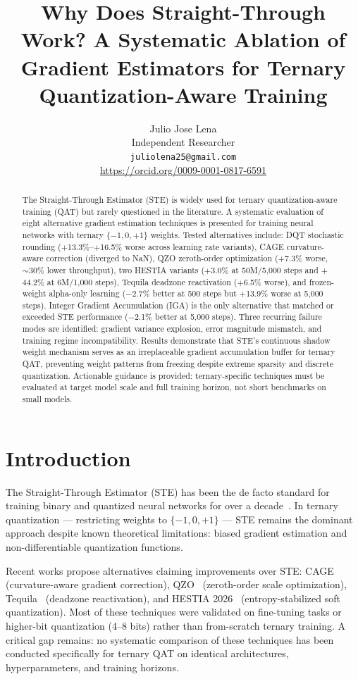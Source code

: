 \documentclass{article}
\title{Why Does Straight-Through Work? A Systematic Ablation of Gradient Estimators for Ternary Quantization-Aware Training}
\author{
  Julio Jose Lena \\
  Independent Researcher \\
  \texttt{juliolena25@gmail.com} \\
  \url{https://orcid.org/0009-0001-0817-6591}
}
\begin{document}
\maketitle

\begin{abstract}
The Straight-Through Estimator (STE) is widely used for ternary quantization-aware training (QAT) but rarely questioned in the literature. A systematic evaluation of eight alternative gradient estimation techniques is presented for training neural networks with ternary $\{-1, 0, +1\}$ weights. Tested alternatives include: DQT stochastic rounding ($+$13.3\%--$+$16.5\% worse across learning rate variants), CAGE curvature-aware correction (diverged to NaN), QZO zeroth-order optimization ($+$7.3\% worse, ${\sim}30\%$ lower throughput), two HESTIA variants ($+$3.0\% at 50M/5{,}000 steps and $+$44.2\% at 6M/1{,}000 steps), Tequila deadzone reactivation ($+$6.5\% worse), and frozen-weight alpha-only learning ($-$2.7\% better at 500 steps but $+$13.9\% worse at 5{,}000 steps). Integer Gradient Accumulation (IGA) is the only alternative that matched or exceeded STE performance ($-$2.1\% better at 5{,}000 steps). Three recurring failure modes are identified: gradient variance explosion, error magnitude mismatch, and training regime incompatibility. Results demonstrate that STE's continuous shadow weight mechanism serves as an irreplaceable gradient accumulation buffer for ternary QAT, preventing weight patterns from freezing despite extreme sparsity and discrete quantization. Actionable guidance is provided: ternary-specific techniques must be evaluated at target model scale and full training horizon, not short benchmarks on small models.
\end{abstract}

\section{Introduction}

The Straight-Through Estimator (STE) has been the de facto standard for training binary and quantized neural networks for over a decade~\citep{bengio2013estimating}. In ternary quantization --- restricting weights to $\{-1, 0, +1\}$ --- STE remains the dominant approach despite known theoretical limitations: biased gradient estimation and non-differentiable quantization functions.

Recent works propose alternatives claiming improvements over STE: CAGE~\citep{cage2025} (curvature-aware gradient correction), QZO~\citep{qzo2025} (zeroth-order scale optimization), Tequila~\citep{tequila2025} (deadzone reactivation), and HESTIA 2026~\citep{hestia2026} (entropy-stabilized soft quantization). Most of these techniques were validated on fine-tuning tasks or higher-bit quantization (4--8 bits) rather than from-scratch ternary training. A critical gap remains: no systematic comparison of these techniques has been conducted specifically for ternary QAT on identical architectures, hyperparameters, and training horizons.
\end{document}
